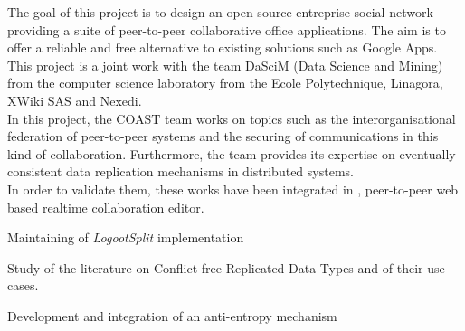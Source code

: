 \documentclass[]{deedy-resume-openfont}
\begin{document}
\sectionsep

\hfill\begin{minipage}{\dimexpr\textwidth-0.5cm}
The goal of this project is to design an open-source entreprise social network providing a suite of
peer-to-peer collaborative office applications.
The aim is to offer a reliable and free alternative to existing solutions such as Google Apps.
This project is a joint work with the team DaSciM (Data Science and Mining) from the
computer science laboratory from the Ecole Polytechnique, Linagora, XWiki SAS and Nexedi.
\\
In this project, the COAST team works on topics such as the interorganisational federation of
peer-to-peer systems and the securing of communications in this kind of collaboration.
Furthermore, the team provides its expertise
on eventually consistent data replication mechanisms in distributed systems.
\\
In order to validate them, these works have been integrated in \href{https://www.coedit.re}{},
peer-to-peer web based realtime collaboration editor.
\begin{tightemize}
\item Maintaining of \emph{LogootSplit}\citep{sp2-l2-9}\citep{sp2-l2-10} implementation
\item Study of the literature on Conflict-free Replicated Data Types and of their use cases.
\item Development and integration of an anti-entropy mechanism\citep{sp2-l2-2}
\end{tightemize}
\sectionsep
\end{minipage}

\hfill\begin{minipage}{\dimexpr\textwidth-0.5cm}
\renewcommand\refname{\vskip -20pt} %


\nocite{*}
\end{minipage}
\end{document}
